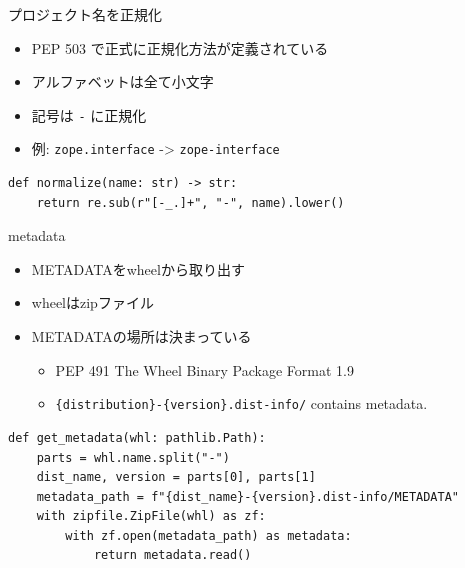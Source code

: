 \documentclass[presentation]{beamer}
\begin{document}
\begin{frame}[label={sec:org1527a9a},fragile]{プロジェクト名を正規化}
 \begin{itemize}
\item PEP 503 で正式に正規化方法が定義されている
\item アルファベットは全て小文字
\item 記号は \texttt{-} に正規化
\item 例: \texttt{zope.interface} -> \texttt{zope-interface}
\end{itemize}

\begin{verbatim}
def normalize(name: str) -> str:
    return re.sub(r"[-_.]+", "-", name).lower()
\end{verbatim}
\end{frame}

\begin{frame}[label={sec:org2054611},fragile]{metadata}
 \begin{itemize}
\item METADATAをwheelから取り出す
\item wheelはzipファイル
\item METADATAの場所は決まっている
\begin{itemize}
\item PEP 491 The Wheel Binary Package Format 1.9
\item \texttt{\{distribution\}-\{version\}.dist-info/} contains metadata.
\end{itemize}
\end{itemize}

\begin{verbatim}
def get_metadata(whl: pathlib.Path):
    parts = whl.name.split("-")
    dist_name, version = parts[0], parts[1]
    metadata_path = f"{dist_name}-{version}.dist-info/METADATA"
    with zipfile.ZipFile(whl) as zf:
        with zf.open(metadata_path) as metadata:
            return metadata.read()

\end{verbatim}
\end{frame}
\end{document}
